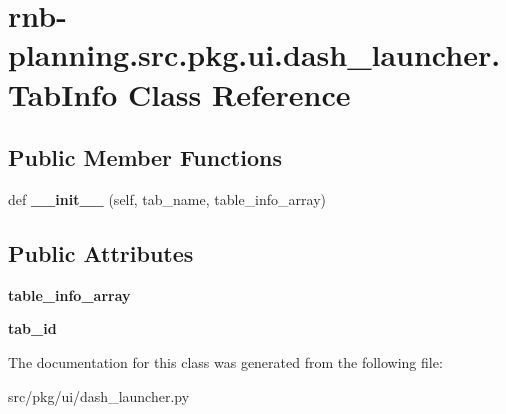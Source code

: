 \hypertarget{classrnb-planning_1_1src_1_1pkg_1_1ui_1_1dash__launcher_1_1_tab_info}{}\section{rnb-\/planning.src.\+pkg.\+ui.\+dash\+\_\+launcher.\+Tab\+Info Class Reference}
\label{classrnb-planning_1_1src_1_1pkg_1_1ui_1_1dash__launcher_1_1_tab_info}
\subsection*{Public Member Functions}
\begin{DoxyCompactItemize}
\item 
\mbox{\label{classrnb-planning_1_1src_1_1pkg_1_1ui_1_1dash__launcher_1_1_tab_info_ae4e58724060b4988f0674f80974f7bfd}} 
def {\bfseries \+\_\+\+\_\+init\+\_\+\+\_\+} (self, tab\+\_\+name, table\+\_\+info\+\_\+array)
\end{DoxyCompactItemize}
\subsection*{Public Attributes}
\begin{DoxyCompactItemize}
\item 
\mbox{\label{classrnb-planning_1_1src_1_1pkg_1_1ui_1_1dash__launcher_1_1_tab_info_a887aa042420d70c09914df42833bdf2c}} 
{\bfseries table\+\_\+info\+\_\+array}
\item 
\mbox{\label{classrnb-planning_1_1src_1_1pkg_1_1ui_1_1dash__launcher_1_1_tab_info_a9a54ca7e0ddf7ce08ebef28a8fdaba8b}} 
{\bfseries tab\+\_\+id}
\end{DoxyCompactItemize}


The documentation for this class was generated from the following file\+:\begin{DoxyCompactItemize}
\item 
src/pkg/ui/dash\+\_\+launcher.\+py\end{DoxyCompactItemize}
